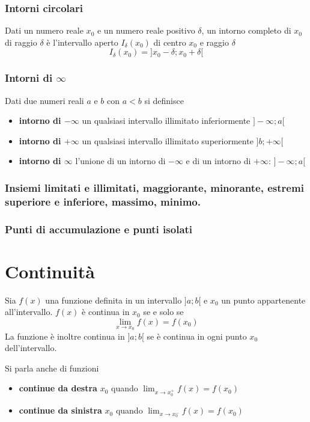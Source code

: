 \documentclass{book}     %
\begin{document}
\subsubsection{Intorni circolari}
    \begin{boxdef}
        Dati un numero reale $x_0$ e un numero reale positivo $\delta$, un intorno completo di $x_0$ di raggio $\delta$ è l'intervallo aperto $I_\delta (x_0)$ di centro $x_0$ e raggio $\delta$ \[I_\delta(x_0)=]x_0-\delta;x_0+\delta[\]
    \end{boxdef}
\subsubsection{Intorni di $\infty$}
\begin{boxdef}
    Dati due numeri reali $a$ e $b$ con $a<b$ si definisce 
    \begin{itemize}
        \item \textbf{intorno di $-\infty$} un qualsiasi intervallo illimitato inferiormente $]-\infty;a[$
        \item \textbf{intorno di $+\infty$} un qualsiasi intervallo illimitato superiormente $]b;+\infty[$
        \item \textbf{intorno di $\infty$} l'unione di un intorno di $-\infty$ e di un intorno di $+\infty$: $]-\infty;a[$
    \end{itemize}
\end{boxdef}
\subsubsection{Insiemi limitati e illimitati, maggiorante, minorante, estremi superiore e inferiore, massimo, minimo.}
\subsubsection{Punti di accumulazione e punti isolati}
\section{Continuità}
\begin{boxdef}
    Sia $f(x)$ una funzione definita in un intervallo $]a;b[$ e $x_0$ un punto appartenente all'intervallo. $f(x)$ è continua in $x_0$ se e solo se \[\lim_{x\to x_0}f(x)=f(x_0)\]
    La funzione è inoltre continua in $]a;b[$ se è continua in ogni punto $x_0$ dell'intervallo.
\end{boxdef}
Si parla anche di funzioni
\begin{itemize}
    \item \textbf{continue da destra} $x_0$ quando $\lim_{x\to x_0^+}f(x)=f(x_0)$
    \item \textbf{continue da sinistra} $x_0$ quando $\lim_{x\to x_0^-}f(x)=f(x_0)$
\end{itemize}
\end{document}
